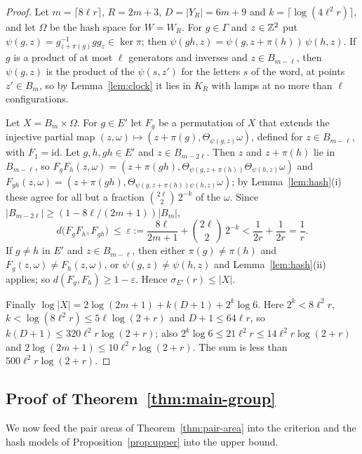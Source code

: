\begin{proof}
Let $m=\lceil8\ell r\rceil$, $R=2m+3$, $D=|Y_R|=6m+9$ and $k=\lceil\log(4\ell^2r)\rceil$, and let $\Omega$ be the hash space for $W=W_R$. For $g\in\Gamma$
and $z\in\mathbb Z^2$ put $\psi(g,z)=g_{z+\pi(g)}^{-1}gg_z\in\ker\pi$; then $\psi(gh,z)=\psi(g,z+\pi(h))\,\psi(h,z)$. If $g$ is a product of at most $\ell$
generators and inverses and $z\in B_{m-\ell}$, then $\psi(g,z)$ is the product of the $\psi(s,z')$ for the letters $s$ of the word, at points
$z'\in B_m$, so by Lemma~\ref{lem:clock} it lies in $K_R$ with lamps at no more than $\ell$ configurations.

Let $X=B_m\times\Omega$. For $g\in E'$ let $F_g$ be a permutation of $X$ that extends the injective partial map
$(z,\omega)\mapsto(z+\pi(g),\Theta_{\psi(g,z)}\omega)$, defined for $z\in B_{m-\ell}$, with $F_1=\mathrm{id}$. Let $g,h,gh\in E'$ and
$z\in B_{m-2\ell}$. Then $z$ and $z+\pi(h)$ lie in $B_{m-\ell}$, so $F_gF_h(z,\omega)=(z+\pi(gh),\Theta_{\psi(g,z+\pi(h))}\Theta_{\psi(h,z)}\omega)$ and
$F_{gh}(z,\omega)=(z+\pi(gh),\Theta_{\psi(g,z+\pi(h))\psi(h,z)}\omega)$; by Lemma~\ref{lem:hash}(i) these agree for all but a fraction
$\binom{2\ell}2\,2^{-k}$ of the $\omega$. Since $|B_{m-2\ell}|\ge(1-8\ell/(2m+1))|B_m|$,
\[
d\bigl(F_gF_h,F_{gh}\bigr)\ \le\ \varepsilon:=\frac{8\ell}{2m+1}+\binom{2\ell}2\,2^{-k}<\frac1{2r}+\frac1{2r}=\frac1r .
\]
If $g\ne h$ in $E'$ and $z\in B_{m-\ell}$, then either $\pi(g)\ne\pi(h)$ and $F_g(z,\omega)\ne F_h(z,\omega)$, or $\psi(g,z)\ne\psi(h,z)$ and
Lemma~\ref{lem:hash}(ii) applies; so $d(F_g,F_h)\ge1-\varepsilon$. Hence $\sigma_{E'}(r)\le|X|$.

Finally $\log|X|=2\log(2m+1)+k(D+1)+2^k\log6$. Here $2^k<8\ell^2r$, $k<\log(8\ell^2r)\le5\ell\log(2+r)$ and $D+1\le64\ell r$, so
$k(D+1)\le320\ell^2r\log(2+r)$; also $2^k\log6\le21\ell^2r\le14\ell^2r\log(2+r)$ and $2\log(2m+1)\le10\ell^2r\log(2+r)$. The sum is less than
$500\ell^2r\log(2+r)$.
\end{proof}

\subsection{Proof of Theorem~\ref{thm:main-group}}

We now feed the pair areas of Theorem~\ref{thm:pair-area} into the criterion and the hash models of Proposition~\ref{prop:upper} into the
upper bound.

